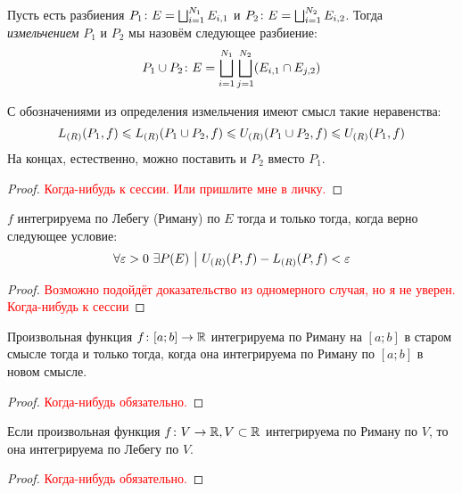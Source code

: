 \begin{definition}
	Пусть есть разбиения $P_1 \colon E = \bigsqcup_{i = 1}^{N_1} E_{i, 1}$ и $P_2 \colon E = \bigsqcup_{i = 1}^{N_2} E_{i, 2}$. Тогда \textit{измельчением} $P_1$ и $P_2$ мы назовём следующее разбиение:
	\[
		P_1 \cup P_2 \colon E = \bigsqcup_{i = 1}^{N_1} \bigsqcup_{j = 1}^{N_2} (E_{i, 1} \cap E_{j, 2})
	\]
\end{definition}

\begin{proposition}
	С обозначениями из определения измельчения имеют смысл такие неравенства:
	\[
		L_{(R)}(P_1, f) \leqslant L_{(R)}(P_1 \cup P_2, f) \leqslant U_{(R)}(P_1 \cup P_2, f) \leqslant U_{(R)}(P_1, f)
	\]
	На концах, естественно, можно поставить и $P_2$ вместо $P_1$.
\end{proposition}

\begin{proof}
	\textcolor{red}{Когда-нибудь к сессии. Или пришлите мне в личку.}
\end{proof}

\begin{proposition} \label{commonEquivLebeg}
	$f$ интегрируема по Лебегу (Риману) по $E$ тогда и только тогда, когда верно следующее условие:
	\[
		\forall \varepsilon > 0\ \exists P(E) \ \big|\  U_{(R)}(P, f) - L_{(R)}(P, f) < \varepsilon
	\]
\end{proposition}

\begin{proof}
	\textcolor{red}{Возможно подойдёт доказательство из одномерного случая, но я не уверен. Когда-нибудь к сессии}
\end{proof}

\begin{proposition}
	Произвольная функция $f \colon [a; b] \to \mathbb{R}$ интегрируема по Риману на $[a; b]$ в старом смысле тогда и только тогда, когда она интегрируема по Риману по $[a; b]$ в новом смысле.
\end{proposition}

\begin{proof}
	\textcolor{red}{Когда-нибудь обязательно.}
\end{proof}

\begin{proposition}
	Если произвольная функция $f \colon V \to \mathbb{R}, V \subset \mathbb{R}$ интегрируема по Риману по $V$, то она интегрируема по Лебегу по $V$.
\end{proposition}

\begin{proof}
	\textcolor{red}{Когда-нибудь обязательно.}
\end{proof}

